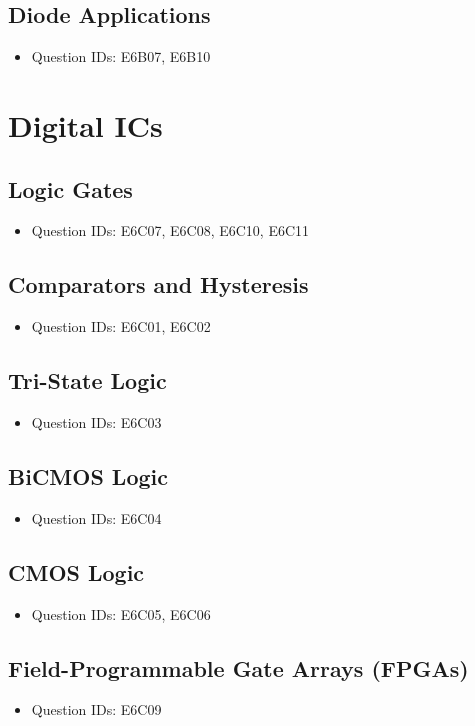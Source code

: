 \documentclass{book}
\begin{document}
\subsection{Diode Applications}
\begin{itemize}
    \item Question IDs: E6B07, E6B10
\end{itemize}

\section{Digital ICs}
\subsection{Logic Gates}
\begin{itemize}
    \item Question IDs: E6C07, E6C08, E6C10, E6C11
\end{itemize}
\subsection{Comparators and Hysteresis}
\begin{itemize}
    \item Question IDs: E6C01, E6C02
\end{itemize}
\subsection{Tri-State Logic}
\begin{itemize}
    \item Question IDs: E6C03
\end{itemize}
\subsection{BiCMOS Logic}
\begin{itemize}
    \item Question IDs: E6C04
\end{itemize}
\subsection{CMOS Logic}
\begin{itemize}
    \item Question IDs: E6C05, E6C06
\end{itemize}
\subsection{Field-Programmable Gate Arrays (FPGAs)}
\begin{itemize}
    \item Question IDs: E6C09
\end{itemize}
\end{document}
